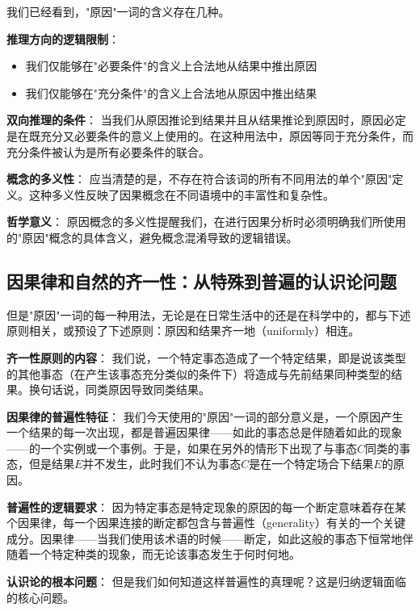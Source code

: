 \begin{theorembox}[title=原因概念的逻辑总结]
我们已经看到，"原因"一词的含义存在几种。

\textbf{推理方向的逻辑限制}：
\begin{itemize}
\item 我们仅能够在"必要条件"的含义上合法地从结果中推出原因
\item 我们仅能够在"充分条件"的含义上合法地从原因中推出结果
\end{itemize}

\textbf{双向推理的条件}：
当我们从原因推论到结果并且从结果推论到原因时，原因必定是在既充分又必要条件的意义上使用的。在这种用法中，原因等同于充分条件，而充分条件被认为是所有必要条件的联合。

\textbf{概念的多义性}：
应当清楚的是，不存在符合该词的所有不同用法的单个"原因"定义。这种多义性反映了因果概念在不同语境中的丰富性和复杂性。

\textbf{哲学意义}：
原因概念的多义性提醒我们，在进行因果分析时必须明确我们所使用的"原因"概念的具体含义，避免概念混淆导致的逻辑错误。
\end{theorembox}

\subsection{因果律和自然的齐一性：从特殊到普遍的认识论问题}

\begin{theorembox}[title=自然齐一性原则的基础地位]
但是"原因"一词的每一种用法，无论是在日常生活中的还是在科学中的，都与下述原则相关，或预设了下述原则：原因和结果齐一地（uniformly）相连。

\textbf{齐一性原则的内容}：
我们说，一个特定事态造成了一个特定结果，即是说该类型的其他事态（在产生该事态充分类似的条件下）将造成与先前结果同种类型的结果。换句话说，同类原因导致同类结果。

\textbf{因果律的普遍性特征}：
我们今天使用的"原因"一词的部分意义是，一个原因产生一个结果的每一次出现，都是普遍因果律——如此的事态总是伴随着如此的现象——的一个实例或一个事例。于是，如果在另外的情形下出现了与事态$C$同类的事态，但是结果$E$并不发生，此时我们不认为事态$C$是在一个特定场合下结果$E$的原因。

\textbf{普遍性的逻辑要求}：
因为特定事态是特定现象的原因的每一个断定意味着存在某个因果律，每一个因果连接的断定都包含与普遍性（generality）有关的一个关键成分。因果律——当我们使用该术语的时候——断定，如此这般的事态下恒常地伴随着一个特定种类的现象，而无论该事态发生于何时何地。

\textbf{认识论的根本问题}：
但是我们如何知道这样普遍性的真理呢？这是归纳逻辑面临的核心问题。
\end{theorembox}

